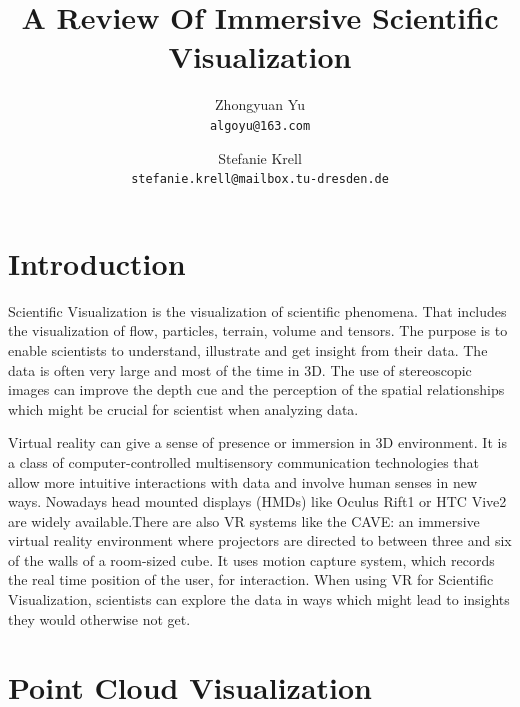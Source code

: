 \documentclass[10pt,twocolumn,letterpaper]{article}
\begin{document}
\title{A Review Of Immersive Scientific Visualization}

\author{Zhongyuan Yu\\
{\tt\small algoyu@163.com}
\and
Stefanie Krell\\
{\tt\small stefanie.krell@mailbox.tu-dresden.de}
}

\maketitle


\section{Introduction}
Scientific Visualization is the visualization of scientific phenomena. That includes the visualization of flow, particles, terrain, volume and tensors. The purpose is to enable scientists to understand, illustrate and get insight from their data. The data is often very large and most of the time in 3D. The use of stereoscopic images can improve the depth cue and the perception of the spatial relationships which might be crucial for scientist when analyzing data.

\setlength{\parindent}{1pc}
Virtual reality can give a sense of presence or immersion in 3D environment. It is a class of computer-controlled multisensory communication technologies that allow more intuitive interactions with data and involve human senses in new ways. Nowadays head mounted displays (HMDs) like Oculus Rift1 or HTC Vive2 are widely available.There are also VR systems like the CAVE: an immersive virtual reality environment where projectors are directed to between three and six of the walls of a room-sized cube. It uses motion capture system, which records the real time position of the user, for interaction. When using VR for Scientific Visualization, scientists can explore the data in ways which might lead to insights they would otherwise not get.

\cleardoublepage
\section{Point Cloud Visualization}
\end{document}
